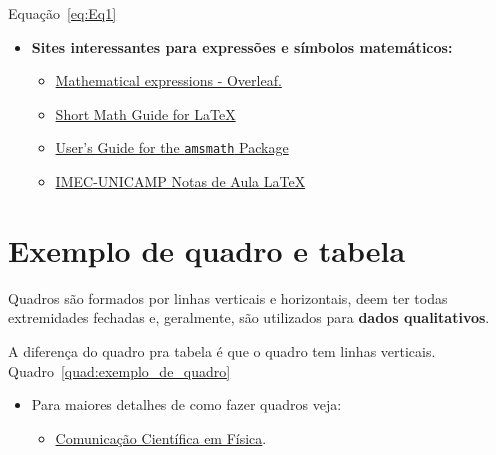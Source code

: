 
Equação~\ref{eq:Eq1}

\begin{itemize}
    \item \textbf{Sites interessantes para expressões e símbolos matemáticos:}
    \begin{itemize}
        \item \hyperlink{https://pt.overleaf.com/learn/latex/Mathematical_expressions}{Mathematical expressions - Overleaf.}
        \item \hyperlink{http://tug.ctan.org/info/short-math-guide/short-math-guide.pdf}{Short Math Guide for \LaTeX{}}
        \item \hyperlink{http://www.ams.org/arc/tex/amsmath/amsldoc.pdf}{User's Guide for the \texttt{amsmath} Package}
        \item \hyperlink{https://www.ime.unicamp.br/~marchesi/Allegati/NotasdeAulaLaTeX.pdf}{IMEC-UNICAMP Notas de Aula \LaTeX{}}
    \end{itemize}
\end{itemize}

\newpage
\section{Exemplo de quadro e tabela}
Quadros são formados por linhas verticais e horizontais, deem ter todas extremidades fechadas e, geralmente, são utilizados para \textbf{dados qualitativos}.

A diferença do quadro pra tabela é que o quadro tem linhas verticais.
Quadro~\ref{quad:exemplo_de_quadro}



\begin{itemize}
    \item Para maiores detalhes de como fazer quadros veja:
    \begin{itemize}
        \item \hyperlink{https://wp.ufpel.edu.br/diehl/files/2017/06/aula11_ccf.pdf}{Comunicação Científica em Física}.
    \end{itemize}
\end{itemize}

